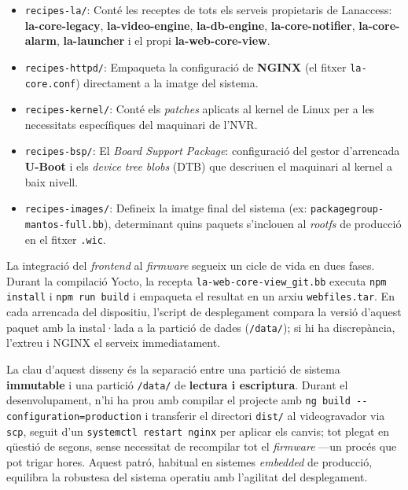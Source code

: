 \begin{itemize}
    \item \texttt{recipes-la/}: Conté les receptes de tots els serveis propietaris de Lanaccess: \textbf{la-core-legacy}, \textbf{la-video-engine}, \textbf{la-db-engine}, \textbf{la-core-notifier}, \textbf{la-core-alarm}, \textbf{la-launcher} i el propi \textbf{la-web-core-view}.
    \item \texttt{recipes-httpd/}: Empaqueta la configuració de \textbf{NGINX} (el fitxer \texttt{la-core\allowbreak{}.conf}) directament a la imatge del sistema.
    \item \texttt{recipes-kernel/}: Conté els \textit{patches} aplicats al kernel de Linux per a les necessitats específiques del maquinari de l'NVR.
    \item \texttt{recipes-bsp/}: El \textit{Board Support Package}: configuració del gestor d'arrencada \textbf{U-Boot} i els \textit{device tree blobs} (DTB) que descriuen el maquinari al kernel a baix nivell.
    \item \texttt{recipes-images/}: Defineix la imatge final del sistema (ex: \texttt{packagegroup\allowbreak{}-mantos\allowbreak{}-full.bb}), determinant quins paquets s'inclouen al \textit{rootfs} de producció en el fitxer \texttt{.wic}.
\end{itemize}

La integració del \textit{frontend} al \textit{firmware} segueix un cicle de vida en dues fases. Durant la compilació Yocto, la recepta \texttt{la-web-core-view\_git.bb} executa \texttt{npm install} i \texttt{npm run build} i empaqueta el resultat en un arxiu \texttt{webfiles.tar}. En cada arrencada del dispositiu, l'script de desplegament compara la versió d'aquest paquet amb la instal·lada a la partició de dades (\texttt{/data/}); si hi ha discrepància, l'extreu i NGINX el serveix immediatament.

La clau d'aquest disseny és la separació entre una partició de sistema \textbf{immutable} i una partició \texttt{/data/} de \textbf{lectura i escriptura}. Durant el desenvolupament, n'hi ha prou amb compilar el projecte amb \texttt{ng build -{}-configuration=production} i transferir el directori \texttt{dist/} al videogravador via \texttt{scp}, seguit d'un \texttt{systemctl restart nginx} per aplicar els canvis; tot plegat en qüestió de segons, sense necessitat de recompilar tot el \textit{firmware} —un procés que pot trigar hores. Aquest patró, habitual en sistemes \textit{embedded} de producció, equilibra la robustesa del sistema operatiu amb l'agilitat del desplegament.

